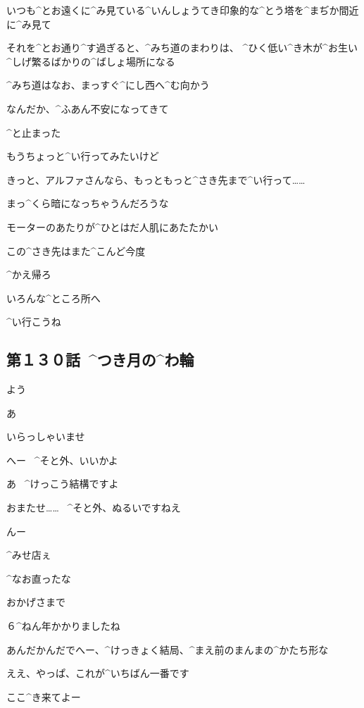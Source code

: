 \page[140]
\Kokone いつも^{とお}{遠}くに^{み}{見}ている^{いんしょうてき}{印象的}な^{とう}{塔}を^{まぢか}{間近}に^{み}{見}て

\page[141]
\Kokone それを^{とお}{通}り^{す}{過}ぎると、^{みち}{道}のまわりは、
^{ひく}{低}い^{き}{木}が^{お}{生}い^{しげ}{繁}るばかりの^{ばしょ}{場所}になる

\Kokone ^{みち}{道}はなお、まっすぐ^{にし}{西}へ^{む}{向}かう

\page[143]
\Kokone なんだか、^{ふあん}{不安}になってきて

\Kokone ^{と}{止}まった

\Kokone もうちょっと^{い}{行}ってみたいけど

\page[144]
\Kokone きっと、アルファさんなら、もっともっと^{さき}{先}まで^{い}{行}って……

\Kokone まっ^{くら}{暗}になっちゃうんだろうな

\Kokone モーターのあたりが^{ひとはだ}{人肌}にあたたかい

\page[145]
\Kokone この^{さき}{先}はまた^{こんど}{今度}

\Kokone ^{かえ}{帰}ろ

\page[146]
\Kokone いろんな^{ところ}{所}へ

\Kokone ^{い}{行}こうね


\subsection{第１３０話\ ^{つき}{月}の^{わ}{輪}}

\page[148]
\Ojisan よう

\Alpha あ

\Alpha いらっしゃいませ

\page[149]
\Ojisan へー
\ ^{そと}{外}、いいかよ

\Alpha あ
\ ^{けっこう}{結構}ですよ

\page[150]
\Alpha おまたせ……
\ ^{そと}{外}、ぬるいですねえ

\Ojisan んー

\page[151]
\Ojisan ^{みせ}{店}ぇ

\Ojisan ^{なお}{直}ったな

\Alpha おかげさまで

\Alpha ６^{ねん}{年}かかりましたね

\Ojisan あんだかんだでへー、^{けっきょく}{結局}、^{まえ}{前}のまんまの^{かたち}{形}な

\Alpha ええ、やっぱ、これが^{いちばん}{一番}です

\page[152]
\Ojisan ここ^{き}{来}てよー

